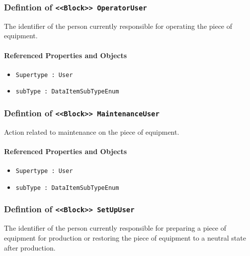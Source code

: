\subsubsection{Defintion of \texttt{<<Block>> OperatorUser}}
  \label{type:OperatorUser}

\FloatBarrier

The identifier of the person currently responsible for operating the piece of equipment.

\FloatBarrier
\paragraph{Referenced Properties and Objects}

\begin{itemize}
\item \texttt{Supertype : User}

\item \texttt{subType : DataItemSubTypeEnum}

\end{itemize}
\FloatBarrier
\subsubsection{Defintion of \texttt{<<Block>> MaintenanceUser}}
  \label{type:MaintenanceUser}

\FloatBarrier

Action related to maintenance on the piece of equipment.

\FloatBarrier
\paragraph{Referenced Properties and Objects}

\begin{itemize}
\item \texttt{Supertype : User}

\item \texttt{subType : DataItemSubTypeEnum}

\end{itemize}
\FloatBarrier
\subsubsection{Defintion of \texttt{<<Block>> SetUpUser}}
  \label{type:SetUpUser}

\FloatBarrier

The identifier of the person currently responsible for preparing a piece of equipment for production or restoring the piece of equipment to a neutral state after production.

